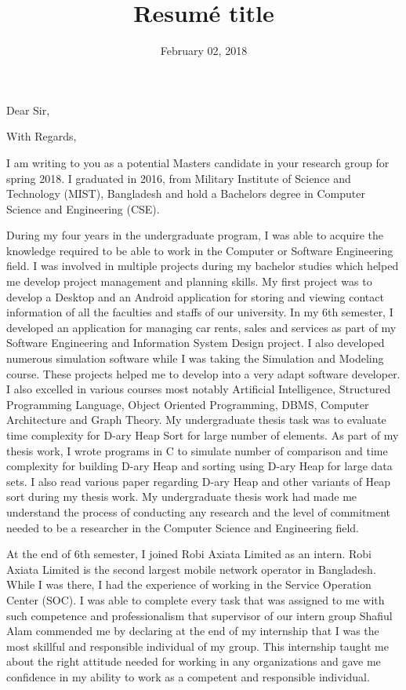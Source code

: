 \documentclass[11pt,a4paper,sans]{moderncv}        %
\title{Resumé title}                               %
\begin{document}
\date{February 02, 2018}
\opening{Dear Sir,}
\closing{With Regards,}
\makelettertitle
\justify
I am writing to you as a potential Masters candidate in your research group for spring 2018. I graduated in 2016, from Military Institute of Science and Technology (MIST), Bangladesh and hold a Bachelors degree in Computer Science and Engineering (CSE).

During my four years in the undergraduate program, I was able to acquire the knowledge required to be able to work in the Computer or Software Engineering field. I was involved in multiple projects during my bachelor studies which helped me develop project management and planning skills. My first project was to develop a Desktop and an Android application for storing and viewing contact information of all the faculties and staffs of our university.  In my 6th semester, I developed an application for managing car rents, sales and services as part of my Software Engineering and Information System Design project. I also developed numerous simulation software while I was taking the Simulation and Modeling course. These projects helped me to develop into a very adapt software developer. I also excelled in various courses most notably Artificial Intelligence, Structured Programming Language, Object Oriented Programming, DBMS, Computer Architecture and Graph Theory. My undergraduate thesis task was to evaluate time complexity for D-ary Heap Sort for large number of elements. As part of my thesis work, I wrote programs in C to simulate number of comparison and time complexity for building D-ary Heap and sorting using D-ary Heap for large data sets. I also read various paper regarding D-ary Heap and other variants of Heap sort during my thesis work. My undergraduate thesis work had made me understand the process of conducting any research and the level of commitment needed to be a researcher in the Computer Science and Engineering field. 

At the end of 6th semester, I joined Robi Axiata Limited as an intern. Robi Axiata Limited is the second largest mobile network operator in Bangladesh. While I was there, I had the experience of working in the Service Operation Center (SOC). I was able to complete every task that was assigned to me with such competence and professionalism that supervisor of our intern group Shafiul Alam commended me by declaring at the end of my internship that I was the most skillful and responsible individual of my group. This internship taught me about the right attitude needed for working in any organizations and gave me confidence in my ability to work as a competent and responsible individual.
\end{document}
